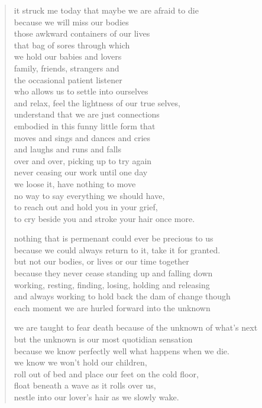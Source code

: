 
\begin{verse}
it struck me today that maybe we are afraid to die \\
because we will miss our bodies \\
those awkward containers of our lives \\
that bag of sores through which \\
we hold our babies and lovers \\
family, friends, strangers and \\
the occasional patient listener \\
who allows us to settle into ourselves \\
and relax, feel the lightness of our true selves, \\
understand that we are just connections \\
embodied in this funny little form that \\
moves and sings and dances and cries \\
and laughs and runs and falls \\
over and over, picking up to try again \\
never ceasing our work until one day \\
we loose it, have nothing to move \\
no way to say everything we should have, \\
to reach out and hold you in your grief, \\
to cry beside you and stroke your hair once more.

nothing that is permenant could ever be precious to us \\
because we could always return to it, take it for granted. \\
but not our bodies, or lives or our time together \\
because they never cease standing up and falling down \\
working, resting, finding, losing, holding and releasing \\
and always working to hold back the dam of change though \\
each moment we are hurled forward into the unknown

we are taught to fear death because of the unknown of what's next\\
but the unknown is our most quotidian sensation\\
because we know perfectly well what happens when we die.\\
we know we won't hold our children,\\
roll out of bed and place our feet on the cold floor,\\
float beneath a wave as it rolls over us,\\
nestle into our lover's hair as we slowly wake.


\end{verse}
